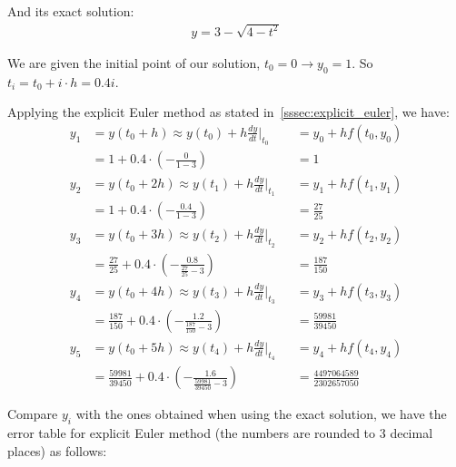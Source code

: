 \documentclass[a4paper]{article}
\begin{document}
And its exact solution:
\begin{align*}
  y = 3 - \sqrt{4-t^2}
\end{align*}

We are given the initial point of our solution, \(t_0 = 0 \rightarrow y_0 = 1\). So \(t_i = t_0 + i \cdot h = 0.4i\).

Applying the explicit Euler method as stated in~\ref{sssec:explicit_euler}, we have:
\begin{align*}
  y_1 & = y(t_0 + h) \approx y(t_0) + h\frac{dy}{dt}\biggr|_{t_0}                           &  & = y_0 + hf(t_0, y_0)            \\
      & = 1 + 0.4 \cdot \left(-\frac{0}{1-3}\right)                                         &  & = 1                             \\
  y_2 & = y(t_0 + 2h) \approx y(t_1) + h\frac{dy}{dt}\biggr|_{t_1}                          &  & = y_1 + hf(t_1, y_1)            \\
      & = 1 + 0.4 \cdot \left(-\frac{0.4}{1-3}\right)                                       &  & = \frac{27}{25}                 \\
  y_3 & = y(t_0 + 3h) \approx y(t_2) + h\frac{dy}{dt}\biggr|_{t_2}                          &  & = y_2 + hf(t_2, y_2)            \\
      & = \frac{27}{25} + 0.4 \cdot \left(-\frac{0.8}{\frac{27}{25} - 3}\right)             &  & = \frac{187}{150}               \\
  y_4 & = y(t_0 + 4h) \approx y(t_3) + h\frac{dy}{dt}\biggr|_{t_3}                          &  & = y_3 + hf(t_3, y_3)            \\
      & = \frac{187}{150} + 0.4 \cdot \left(-\frac{1.2}{\frac{187}{150} - 3}\right)         &  & = \frac{59981}{39450}           \\
  y_5 & = y(t_0 + 5h) \approx y(t_4) + h\frac{dy}{dt}\biggr|_{t_4}                          &  & = y_4 + hf(t_4, y_4)            \\
      & = \frac{59981}{39450} + 0.4 \cdot \left(-\frac{1.6}{\frac{59981}{39450} - 3}\right) &  & = \frac{4497064589}{2302657050}
\end{align*}

Compare \(y_i\) with the ones obtained when using the exact solution, we have the error table for explicit Euler method (the numbers are rounded to 3 decimal places) as follows:
\end{document}
